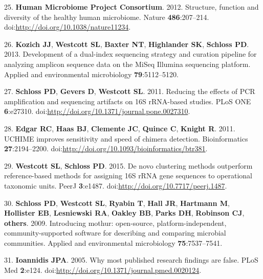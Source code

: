 \documentclass[12pt,]{article}
\begin{document}
25. \textbf{Human Microbiome Project Consortium}. 2012. Structure,
function and diversity of the healthy human microbiome. Nature
\textbf{486}:207--214. doi:\url{http://doi.org/10.1038/nature11234}.

26. \textbf{Kozich JJ}, \textbf{Westcott SL}, \textbf{Baxter NT},
\textbf{Highlander SK}, \textbf{Schloss PD}. 2013. Development of a
dual-index sequencing strategy and curation pipeline for analyzing
amplicon sequence data on the MiSeq Illumina sequencing platform.
Applied and environmental microbiology \textbf{79}:5112--5120.

27. \textbf{Schloss PD}, \textbf{Gevers D}, \textbf{Westcott SL}. 2011.
Reducing the effects of PCR amplification and sequencing artifacts on
16S rRNA-based studies. PLoS ONE \textbf{6}:e27310.
doi:\url{http://doi.org/10.1371/journal.pone.0027310}.

28. \textbf{Edgar RC}, \textbf{Haas BJ}, \textbf{Clemente JC},
\textbf{Quince C}, \textbf{Knight R}. 2011. UCHIME improves sensitivity
and speed of chimera detection. Bioinformatics \textbf{27}:2194--2200.
doi:\url{http://doi.org/10.1093/bioinformatics/btr381}.

29. \textbf{Westcott SL}, \textbf{Schloss PD}. 2015. De novo clustering
methods outperform reference-based methods for assigning 16S rRNA gene
sequences to operational taxonomic units. PeerJ \textbf{3}:e1487.
doi:\url{http://doi.org/10.7717/peerj.1487}.

30. \textbf{Schloss PD}, \textbf{Westcott SL}, \textbf{Ryabin T},
\textbf{Hall JR}, \textbf{Hartmann M}, \textbf{Hollister EB},
\textbf{Lesniewski RA}, \textbf{Oakley BB}, \textbf{Parks DH},
\textbf{Robinson CJ}, \textbf{others}. 2009. Introducing mothur:
open-source, platform-independent, community-supported software for
describing and comparing microbial communities. Applied and
environmental microbiology \textbf{75}:7537--7541.

31. \textbf{Ioannidis JPA}. 2005. Why most published research findings
are false. PLoS Med \textbf{2}:e124.
doi:\url{http://doi.org/10.1371/journal.pmed.0020124}.
\end{document}

